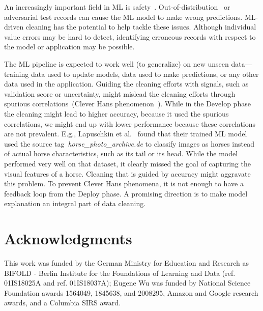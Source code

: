 \documentclass[11pt,dvipsnames]{article}
\begin{document}
 An increasingly important field in ML is safety~\cite{Picket}.  Out-of-distribution~\cite{lee_simple_nodate} or adversarial test records can cause the ML model to make wrong predictions. ML-driven cleaning has the potential to help tackle these issues.  Although individual value errors may be hard to detect, identifying erroneous records with respect to the model or application may be possible.  

The ML pipeline is expected to work well (to generalize) on new unseen data---training data used to update models, data used to make predictions, or any other data used in the application. Guiding the cleaning efforts with signals, such as validation score or uncertainty, might mislead the cleaning efforts through spurious correlations~(Clever Hans phenomenon~\cite{CleverHans}). While in the Develop phase the cleaning might lead to higher accuracy, because it used the spurious correlations, we might end up with lower performance because these correlations are not prevalent. E.g., Lapuschkin et al.~\cite{CleverHans} found that their trained ML model used the source tag~\emph{horse\_photo\_archive.de} to classify images as horses instead of actual horse characteristics, such as its tail or its head. While the model performed very well on that dataset, it clearly missed the goal of capturing the visual features of a horse. Cleaning that is guided by accuracy might aggravate this problem. To prevent Clever Hans phenomena, it is not enough to have a feedback loop from the Deploy phase. A promising direction is to make model explanation an integral part of data cleaning. 



\section*{Acknowledgments}

This work was funded by the German Ministry for Education and Research as BIFOLD - Berlin Institute for the Foundations of Learning and Data (ref. 01IS18025A and ref. 01IS18037A); Eugene Wu was funded by National Science Foundation awards 1564049, 1845638, and 2008295, Amazon and Google research awards, and a Columbia SIRS award.  


%
%
\end{document}
